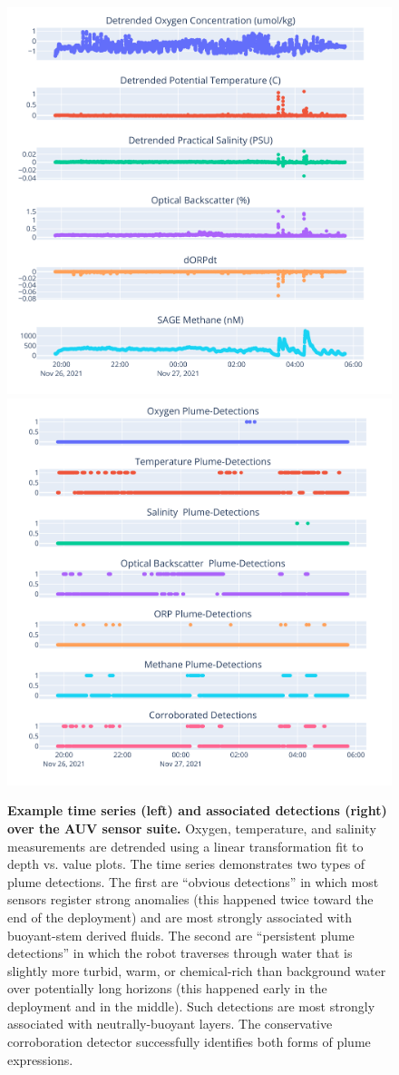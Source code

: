 \begin{figure}
    \centering
    \includegraphics[width=0.45\linewidth]{figures/binary_example_time.png}
    \hspace{.05in}
    \includegraphics[width=0.45\linewidth]{figures/binary_example_detections.png}
    \caption[Example time series (left) and associated detections (right) over the AUV \Sentry sensor suite.]{\textbf{Example time series (left) and associated detections (right) over the AUV \Sentry sensor suite.} Oxygen, temperature, and salinity measurements are detrended using a linear transformation fit to depth vs. value plots. The time series demonstrates two types of plume detections. The first are ``obvious detections'' in which most sensors register strong anomalies (this happened twice toward the end of the deployment) and are most strongly associated with buoyant-stem derived fluids. The second are ``persistent plume detections'' in which the robot traverses through water that is slightly more turbid, warm, or chemical-rich than background water over potentially long horizons (this happened early in the deployment and in the middle). Such detections are most strongly associated with neutrally-buoyant layers. The conservative corroboration detector successfully identifies both forms of plume expressions.}
    \label{fig:detection_example}
\end{figure}

